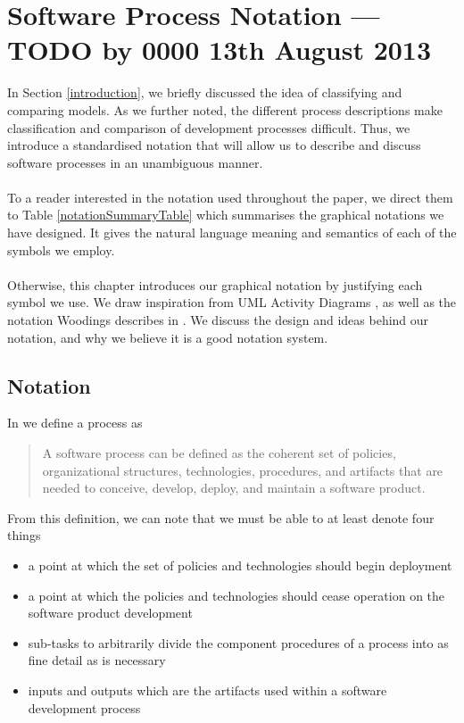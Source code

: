 \section{Software Process Notation --- TODO by 0000 13th August 2013} \label{notation}

In Section \ref{introduction}, we briefly discussed the idea of classifying and comparing models.
As we further noted, the different process descriptions make classification and comparison of
development processes difficult.
Thus, we introduce a standardised notation that will allow us to describe and discuss software
processes in an unambiguous manner.\\
\\
To a reader interested in the notation used throughout the paper, we direct them
to Table \ref{notationSummaryTable} which summarises the graphical notations we have
designed.
It gives the natural language meaning and semantics of each of the symbols we employ.\\
\\
Otherwise, this chapter introduces our graphical notation by justifying each symbol we
use.
We draw inspiration from UML Activity Diagrams \cite{Dumas01umlactivity,BellUMLBasics}, as well as
the notation Woodings describes in \cite{Woodings2013Tut1}.
We discuss the design and ideas behind our notation, and why we believe it is a
good notation system.
\subsection{Notation}

In \cite{fuggetta2000software} we define a process as
\begin{quote}
A software process can be defined as the coherent set of policies, organizational structures,
	technologies, procedures, and artifacts that are needed to conceive, develop, deploy, and maintain
	a software product.
\end{quote}

From this definition, we can note that we must be able to at least denote four things
\begin{itemize}
	\item a point at which the set of policies and technologies should begin deployment
	\item a point at which the policies and technologies should cease operation on the software
	product development
	\item sub-tasks to arbitrarily divide the component procedures of a process into as fine detail as
	is necessary
	\item inputs and outputs which are the artifacts used within a software development process
\end{itemize}

